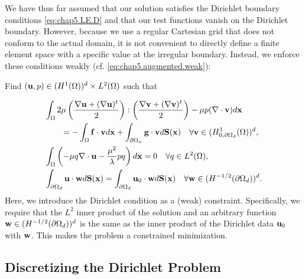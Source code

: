 We have thus far assumed that our solution satisfies the Dirichlet boundary conditions \eqref{eq:chap5.LE.D} and that our test functions vanish on the Dirichlet boundary. However, because we use a regular Cartesian grid that does not conform to the actual domain, it is not convenient to directly define a finite element space with a specific value at the irregular boundary. Instead, we enforce these conditions weakly (cf. \eqref{eq:chap5.augmented.weak}):
\begin{center}
Find $(\mathbf{u},p) \in (H^1(\Omega))^d \times L^2(\Omega)$ such that
\end{center}
\begin{subequations} \label{eq:chap5.dirichlet.weak}
\begin{align}
& \int_{\Omega} 2 \mu \left( \frac{\nabla \mathbf{u} + (\nabla \mathbf{u})^t}{2} \right) : \left( \frac{\nabla \mathbf{v} + (\nabla \mathbf{v})^t}{2} \right) - \mu p (\nabla \cdot \mathbf{v}) d\mathbf{x} \\
& \qquad = -\int_{\Omega} \mathbf{f} \cdot \mathbf{v} d\mathbf{x} + \int_{\partial\Omega_n} \mathbf{g} \cdot \mathbf{v} d\mathbf{S}(\mathbf{x}) \quad \forall \mathbf{v} \in (H^1_{0,\partial\Omega_d}(\Omega))^d, \\
& \int_{\Omega} \left( -\mu q \nabla \cdot \mathbf{u} - \frac{\mu^2}{\lambda} p q \right) d\mathbf{x} = 0 \quad \forall q \in L^2(\Omega), \\
& \int_{\partial\Omega_d} \mathbf{u} \cdot \mathbf{w} d\mathbf{S}(\mathbf{x}) = \int_{\partial\Omega_d} \mathbf{u}_0 \cdot \mathbf{w} d\mathbf{S}(\mathbf{x}) \quad \forall \mathbf{w} \in (H^{-1/2}(\partial\Omega_d))^d. \label{eq:chap5.dirichlet.constraint.continuous}
\end{align}
\end{subequations}
Here, we introduce the Dirichlet condition as a (weak) constraint. Specifically, we require that the $L^2$ inner product of the solution and an arbitrary function $\mathbf{w} \in (H^{-1/2}(\partial\Omega_d))^d$ is the same as the inner product of the Dirichlet data $\mathbf{u}_0$ with $\mathbf{w}$. This makes the problem a constrained minimization.

\subsection{Discretizing the Dirichlet Problem} \label{subsec:chap5.dirichlet.discretization}

